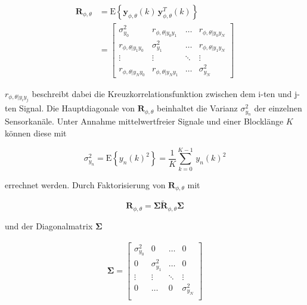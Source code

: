 	
\begin{align}
\mathbf{R}_{\phi,\theta} & = \mathrm{E} \left \{ \mathbf{y}_{\phi,\theta}(k) \, \mathbf{y}^T_{\phi,\theta}(k)  \right \} \\
                & = 
    \begin{bmatrix}
    \sigma_{y_0}^2	     & r_{\phi,\theta | y_0 y_1}     & \dots & r_{\phi,\theta | y_0 y_N}       \\
    r_{\phi,\theta | y_1 y_0}	  & \sigma_{y_1}^2      & \dots & r_{\phi,\theta | y_1 y_N}       \\
    \vdots	            & \vdots 	           & \ddots & \vdots                \\
    r_{\phi,\theta | y_N y_0} 	  & r_{\phi,\theta | y_N y_1}     & \dots	 & \sigma_{y_N}^2
    \end{bmatrix}
\end{align}


$r_{\phi,\theta | y_i y_j}$ beschreibt dabei die Kreuzkorrelationsfunktion zwischen dem i-ten und j-ten Signal. Die Hauptdiagonale von $\mathbf{R}_{\phi,\theta}$ beinhaltet die Varianz $\sigma_{y_n}^2$ der einzelnen Sensorkanäle. Unter Annahme mittelwertfreier Signale und einer Blocklänge $K$ können diese mit


\begin{equation}
    \sigma_{y_n}^2 = \mathrm{E} \left \{ y_n(k)^2 \right \} = \frac{1}{K} \sum_{k=0}^{K-1} \, y_n(k)^2 
\end{equation}
 
errechnet werden. Durch Faktorisierung von $\mathbf{R}_{\phi,\theta}$ mit

\begin{equation}
   \mathbf{R}_{\phi,\theta} = \boldsymbol{\Sigma} \mathbf{\tilde R}_{\phi,\theta}\boldsymbol{\Sigma}
\end{equation}

und der Diagonalmatrix $\boldsymbol{\Sigma}$
		
\begin{align*}
		\boldsymbol{\Sigma} = 
		\begin{bmatrix}
		     \sigma_{y_0}^2 &     0                 &    \dots     & 0 \\
		     0              &     \sigma_{y_1}^2    &    \dots     & 0 \\
		     \vdots         &     \vdots            &    \ddots    & \vdots \\
		     0              &     \dots             &        0     & \sigma_{y_N}^2 \\
		\end{bmatrix}
\end{align*}

